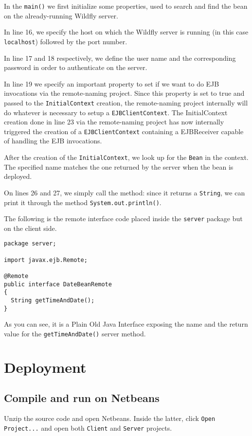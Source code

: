 \documentclass{report}
\begin{document}
In the \texttt{main()} we first initialize some properties, used to search and find the bean on the already-running Wildfly server.

In line 16, we specify the host on which the Wildfly server is running (in this case \texttt{localhost}) followed by the port number.

In line 17 and 18 respectively, we define the user name and the corresponding password in order to authenticate on the server.

In line 19 we specify an important property to set if we want to do EJB invocations via the remote-naming project. Since this property is set to true and passed to the \texttt{InitialContext} creation, the remote-naming project internally will do whatever is necessary to setup a \texttt{EJBClientContext}. The InitialContext creation done in line 23 via the remote-naming project has now internally triggered the creation of a \texttt{EJBClientContext} containing a EJBReceiver capable of handling the EJB invocations.

After the creation of the \texttt{InitialContext}, we look up for the \texttt{Bean} in the context. The specified name matches the one returned by the server when the bean is deployed. 

On lines 26 and 27, we simply call the method: since it returns a \texttt{String}, we can print it through the method \texttt{System.out.println()}.

The following is the remote interface code placed inside the \texttt{server} package but on the client side.
\begin{lstlisting}
package server;

import javax.ejb.Remote;

@Remote
public interface DateBeanRemote
{
  String getTimeAndDate();
}
\end{lstlisting}
As you can see, it is a Plain Old Java Interface exposing the name and the return value for the \texttt{getTimeAndDate()} server method.

\chapter{Deployment}
\section{Compile and run on Netbeans}
Unzip the source code and open Netbeans. Inside the latter, click \texttt{Open Project...} and open both \texttt{Client} and \texttt{Server} projects.
\end{document}

